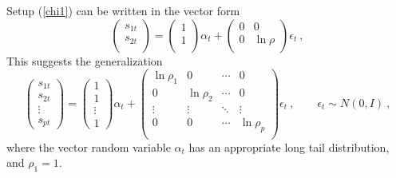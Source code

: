 \documentclass[a4paper,12pt]{article}
\newcommand{\eps}{\epsilon}
\newcommand{\eref}[1]{(\ref{#1})}
\begin{document}
Setup \eref{chi1} can be written in the vector form
    \begin{equation}\label{mat2}
        \left(
    \begin{array}{c}
      s_{1t} \\
      s_{2t} \\
    \end{array}
  \right)=
\left(
  \begin{array}{c}
    1 \\
    1 \\
  \end{array}
\right)
\alpha_t + \left(
              \begin{array}{cc}
                0 & 0 \\
                0 & \ln\rho \\
              \end{array}
            \right)\eps_t\ ,
    \end{equation}
This suggests the generalization
 \begin{equation}\label{mcop}
     \left(
    \begin{array}{c}
      s_{1t} \\
      s_{2t} \\
      \vdots\\
      s_{pt}
    \end{array}
  \right)=
\left(
  \begin{array}{c}
    1 \\
    1 \\
    \vdots \\
    1
  \end{array}
\right)
\alpha_t + \left(
              \begin{array}{cccc}
                \ln \rho_1 & 0 & \cdots & 0 \\
                0 & \ln\rho_2 & \cdots & 0 \\
                \vdots & \vdots & \ddots & \vdots \\
                0 & 0 & \cdots & \ln \rho_p \\
              \end{array}
            \right)\eps_t\ ,\qquad \eps_t\sim N(0,I)\ ,
  \end{equation}
  where the vector random variable $\alpha_t$ has an appropriate long tail distribution, and $\rho_1=1$.
\end{document}

